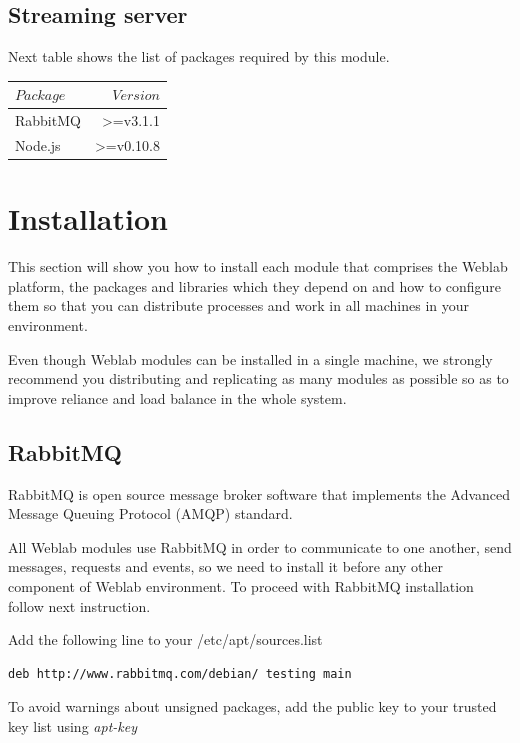 \documentclass{article}
\begin{document}
\subsection{Streaming server}
\label{sub:StreamingSRV}
Next table shows the list of packages required by this module.

\begin{center}
\begin{tabular}{|l|r|}
	\hline
$Package$ & $Version$  \\
	\hline
RabbitMQ & \textgreater=v3.1.1 \\
Node.js & \textgreater=v0.10.8 \\
	\hline
\end{tabular}
\end{center}

\section{Installation}

This section will show you how to install each module that comprises the Weblab platform, the packages and libraries which they depend on and how to configure them so that you can distribute processes and work in all machines in your environment.

Even though Weblab modules can be installed in a single machine, we strongly recommend you distributing and replicating as many modules as possible so as to improve reliance and load balance in the whole system.

\subsection{RabbitMQ}
\label{sub:RabbitMQInstall}
RabbitMQ is open source message broker software that implements the Advanced Message Queuing Protocol (AMQP) standard.

All Weblab modules use RabbitMQ in order to communicate to one another, send messages, requests and events, so we need to install it before any other component of Weblab environment. To proceed with RabbitMQ installation follow next instruction.

Add the following line to your /etc/apt/sources.list

\begin{verbatim}
deb http://www.rabbitmq.com/debian/ testing main
\end{verbatim}

To avoid warnings about unsigned packages, add the public key to your trusted key list using \textit{apt-key}
\end{document}
